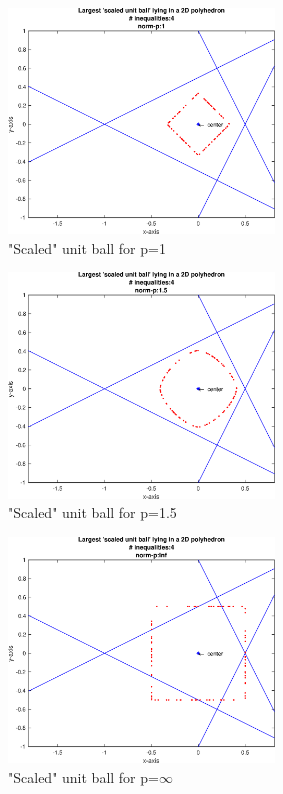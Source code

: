 \documentclass[10pt]{article}
\newcommand{\0}{\mat{0}}
\begin{document}
\begin{enumerate}
\begin{enumerate}
\begin{figure}[H]
	\centering
	\includegraphics[width=200pt]{figures/chebyshev_center_norm_1}
	\caption{"Scaled" unit ball for p=1}
	\label{fig3}
\end{figure}
\begin{figure}[H]
	\centering
	\includegraphics[width=200pt]{figures/chebyshev_center_norm_15}
	\caption{"Scaled" unit ball for p=1.5}
	\label{fig4}
\end{figure}
\begin{figure}[H]
	\centering
	\includegraphics[width=200pt]{figures/chebyshev_center_norm_Inf}
	\caption{"Scaled" unit ball for p=$\infty$}
	\label{fig5}
\end{figure}

\begin{verbatim}


\end{verbatim}
\end{enumerate}
\end{enumerate}
\end{document}
